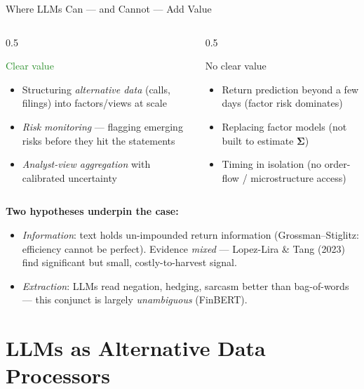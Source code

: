 \documentclass[9pt,t]{beamer}
\begin{document}
\begin{frame}{Where LLMs Can --- and Cannot --- Add Value}
\begin{columns}[T]
\begin{column}{0.5\textwidth}
\begin{block}{\textcolor{forestgreen}{Clear value}}
\begin{itemize}
  \item Structuring \emph{alternative data} (calls, filings) into factors/views at scale
  \item \emph{Risk monitoring} --- flagging emerging risks before they hit the statements
  \item \emph{Analyst-view aggregation} with calibrated uncertainty
\end{itemize}
\end{block}
\end{column}
\begin{column}{0.5\textwidth}
\begin{alertblock}{No clear value}
\begin{itemize}
  \item Return prediction beyond a few days (factor risk dominates)
  \item Replacing factor models (not built to estimate $\boldsymbol{\Sigma}$)
  \item Timing in isolation (no order-flow / microstructure access)
\end{itemize}
\end{alertblock}
\end{column}
\end{columns}

\medskip
\textbf{Two hypotheses underpin the case:}
\begin{itemize}
  \item \emph{Information}: text holds un-impounded return information
        (Grossman--Stiglitz: efficiency cannot be perfect). Evidence \emph{mixed} ---
        Lopez-Lira \& Tang (2023) find significant but small, costly-to-harvest signal.
  \item \emph{Extraction}: LLMs read negation, hedging, sarcasm better than bag-of-words
        --- this conjunct is largely \emph{unambiguous} (FinBERT).
\end{itemize}
\end{frame}

\section{LLMs as Alternative Data Processors}
\end{document}

